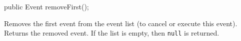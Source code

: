 \begin{code}

   public Event removeFirst();
\end{code}
 \begin{tabb}  Removes the first event from the event list (to cancel or
    execute this event).  Returns the removed event.  If the list is empty,
    then {\tt null} is returned.
 \end{tabb}
\begin{htmlonly}
\end{htmlonly}
\begin{code}\begin{hide}
}\end{hide}
\end{code}
